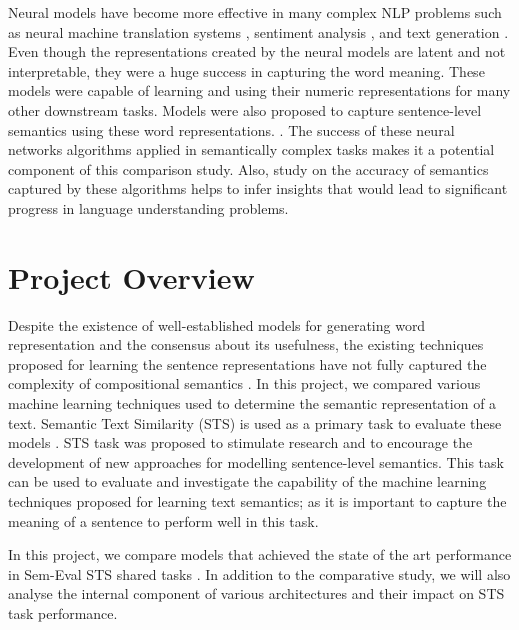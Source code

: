\documentclass[12pt]{report} %
\begin{document}
	
	Neural models have become more effective in many complex NLP problems such as neural machine translation systems \citep{luong2015effective}, sentiment analysis \citep{socher2011semi}, and text generation \citep{wen2015semantically} . Even though the representations created by the neural models are latent and not interpretable, they were a huge success in capturing the word meaning. These models were capable of learning and using their numeric representations for many other downstream tasks. Models were also proposed to capture sentence-level semantics using these word representations.  \citep{kiros2015skip,conneau2017supervised,shao2017hcti}. The success of these neural networks algorithms applied in semantically complex tasks makes it a potential component of this comparison study. Also, study on the accuracy of semantics captured by these algorithms helps to infer insights that would lead to significant progress in language understanding problems.
	
	
	
	\section{Project Overview}
	\label{proj_overview}
	Despite the existence of well-established models for generating word representation and the consensus about its usefulness, the existing techniques proposed for learning the sentence representations have not fully captured the complexity of compositional semantics \citep{conneau2017supervised}. In this project, we compared various machine learning techniques used to determine the semantic representation of a text. Semantic Text Similarity (STS) is used as a primary task to evaluate these models  \citep{agirre2012semeval}. STS task was proposed to stimulate research and to encourage the development of new approaches for modelling sentence-level semantics. %
	This task can be used to evaluate and investigate the capability of the machine learning techniques proposed for learning text semantics; as it is important to capture the meaning of a sentence to perform well in this task.
	
	
	In this project, we compare models that achieved the state of the art performance in Sem-Eval STS shared tasks \citep{cer2017semeval}.  In addition to the comparative study, we will also analyse the internal component of various architectures and their impact on STS task performance.
	
\end{document}
